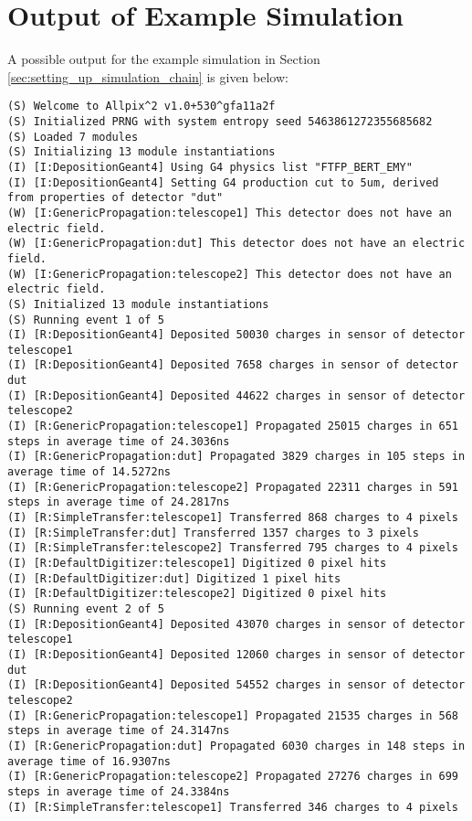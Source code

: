 \section{Output of Example Simulation}
\label{sec:example_output}
A possible output for the example simulation in Section \ref{sec:setting_up_simulation_chain} is given below:

\begin{lstlisting}[breaklines]
(S) Welcome to Allpix^2 v1.0+530^gfa11a2f
(S) Initialized PRNG with system entropy seed 5463861272355685682
(S) Loaded 7 modules
(S) Initializing 13 module instantiations
(I) [I:DepositionGeant4] Using G4 physics list "FTFP_BERT_EMY"
(I) [I:DepositionGeant4] Setting G4 production cut to 5um, derived from properties of detector "dut"
(W) [I:GenericPropagation:telescope1] This detector does not have an electric field.
(W) [I:GenericPropagation:dut] This detector does not have an electric field.
(W) [I:GenericPropagation:telescope2] This detector does not have an electric field.
(S) Initialized 13 module instantiations
(S) Running event 1 of 5
(I) [R:DepositionGeant4] Deposited 50030 charges in sensor of detector telescope1
(I) [R:DepositionGeant4] Deposited 7658 charges in sensor of detector dut
(I) [R:DepositionGeant4] Deposited 44622 charges in sensor of detector telescope2
(I) [R:GenericPropagation:telescope1] Propagated 25015 charges in 651 steps in average time of 24.3036ns
(I) [R:GenericPropagation:dut] Propagated 3829 charges in 105 steps in average time of 14.5272ns
(I) [R:GenericPropagation:telescope2] Propagated 22311 charges in 591 steps in average time of 24.2817ns
(I) [R:SimpleTransfer:telescope1] Transferred 868 charges to 4 pixels
(I) [R:SimpleTransfer:dut] Transferred 1357 charges to 3 pixels
(I) [R:SimpleTransfer:telescope2] Transferred 795 charges to 4 pixels
(I) [R:DefaultDigitizer:telescope1] Digitized 0 pixel hits
(I) [R:DefaultDigitizer:dut] Digitized 1 pixel hits
(I) [R:DefaultDigitizer:telescope2] Digitized 0 pixel hits
(S) Running event 2 of 5
(I) [R:DepositionGeant4] Deposited 43070 charges in sensor of detector telescope1
(I) [R:DepositionGeant4] Deposited 12060 charges in sensor of detector dut
(I) [R:DepositionGeant4] Deposited 54552 charges in sensor of detector telescope2
(I) [R:GenericPropagation:telescope1] Propagated 21535 charges in 568 steps in average time of 24.3147ns
(I) [R:GenericPropagation:dut] Propagated 6030 charges in 148 steps in average time of 16.9307ns
(I) [R:GenericPropagation:telescope2] Propagated 27276 charges in 699 steps in average time of 24.3384ns
(I) [R:SimpleTransfer:telescope1] Transferred 346 charges to 4 pixels

\end{lstlisting}

